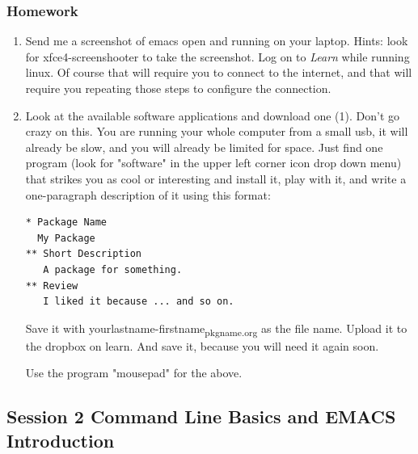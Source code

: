 \documentclass{article}
\begin{document}
\subsubsection{Homework}
\label{sec:orgfb74080}
\begin{enumerate}
\item Send me a screenshot of emacs open and running on your laptop.
Hints: look for xfce4-screenshooter to take the screenshot. Log on to \emph{Learn} while running linux. Of course that will require you to connect to the internet, and that will require you repeating those steps to configure the connection.
\item Look at the available software applications and download one (1). Don't go crazy on this. You are running your whole computer from a small usb, it will already be slow, and you will already be limited for space. Just find one program (look for "software" in the upper left corner icon drop down menu) that strikes you as cool or interesting and install it, play with it, and write a one-paragraph description of it using this format:

\begin{verbatim}
* Package Name
  My Package
** Short Description
   A package for something.
** Review
   I liked it because ... and so on.
\end{verbatim}

Save it with yourlastname-firstname\textsubscript{pkgname.org} as the file name. Upload it to the dropbox on learn. And save it, because you will need it again soon. 

Use the program "mousepad" for the above.
\end{enumerate}
\subsection{Session 2 Command Line Basics and EMACS Introduction}
\label{sec:org7c00da7}
\end{document}
